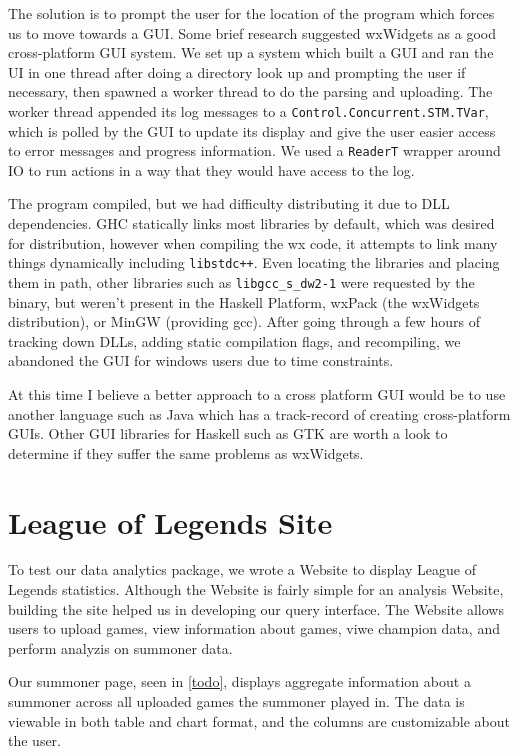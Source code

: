 \documentclass[letterpaper,twocolumn,9pt]{article}
\newcommand{\code}[1]{\texttt{#1}}
\begin{document}
The solution is to prompt the user for the location of the program which forces us to move towards a GUI.  Some brief research suggested wxWidgets as a good cross-platform GUI system.  We set up a system which built a GUI and ran the UI in one thread after doing a directory look up and prompting the user if necessary, then spawned a worker thread to do the parsing and uploading.  The worker thread appended its log messages to a \code{Control.Concurrent.STM.TVar}, which is polled by the GUI to update its display and give the user easier access to error messages and progress information.  We used a \code{ReaderT} wrapper around IO to run actions in a way that they would have access to the log.

The program compiled, but we had difficulty distributing it due to DLL dependencies.  GHC statically links most libraries by default, which was desired for distribution, however when compiling the wx code, it attempts to link many things dynamically including \code{libstdc++}.  Even locating the libraries and placing them in path, other libraries such as \code{libgcc\_s\_dw2-1} were requested by the binary, but weren't present in the Haskell Platform, wxPack (the wxWidgets distribution), or MinGW (providing gcc).  After going through a few hours of tracking down DLLs, adding static compilation flags, and recompiling, we abandoned the GUI for windows users due to time constraints.

At this time I believe a better approach to a cross platform GUI would be to use another language such as Java which has a track-record of creating cross-platform GUIs. Other GUI libraries for Haskell such as GTK are worth a look to determine if they suffer the same problems as wxWidgets.

\section{League of Legends Site}
\label{site}

To test our data analytics package, we wrote a Website to display League of Legends statistics. Although the Website is fairly simple for an analysis Website, building the site helped us in developing our query interface. The Website allows users to upload games, view information about games, viwe champion data, and perform analyzis on summoner data.

Our summoner page, seen in \ref{todo}, displays aggregate information about a summoner across all uploaded games the summoner played in. The data is viewable in both table and chart format, and the columns are customizable about the user.
\end{document}

